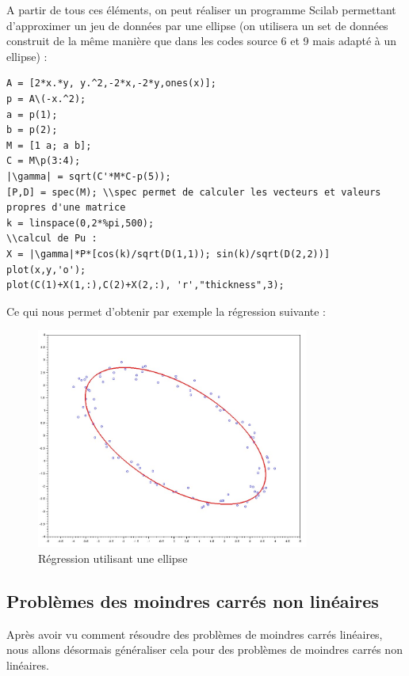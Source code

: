          A partir de tous ces éléments, on peut réaliser un programme Scilab permettant d'approximer un jeu de données par une ellipse (on utilisera un set de données construit de la même manière que dans les codes source 6 et 9 mais adapté à un ellipse) :
         \begin{center}
          \begin{verbatim}
A = [2*x.*y, y.^2,-2*x,-2*y,ones(x)];
p = A\(-x.^2);
a = p(1);
b = p(2);
M = [1 a; a b];
C = M\p(3:4);
|\gamma| = sqrt(C'*M*C-p(5));
[P,D] = spec(M); \\spec permet de calculer les vecteurs et valeurs propres d'une matrice
k = linspace(0,2*%pi,500);
\\calcul de Pu :
X = |\gamma|*P*[cos(k)/sqrt(D(1,1)); sin(k)/sqrt(D(2,2))] 
plot(x,y,'o');
plot(C(1)+X(1,:),C(2)+X(2,:), 'r',"thickness",3);
          \end{verbatim}
                \label{lst:code_10}
         \end{center}
         \newpage
         Ce qui nous permet d'obtenir par exemple la régression suivante :
         \begin{figure}[h]
              \centering
                \includegraphics[width=0.8\textwidth]{images/ellipse.jpg}
              \caption{Régression utilisant une ellipse}
              \label{fig:reg7}
            \end{figure}
      \subsection{Problèmes des moindres carrés non linéaires}
      Après avoir vu comment résoudre des problèmes de moindres carrés linéaires, nous allons désormais généraliser cela pour des problèmes de moindres carrés non linéaires.
